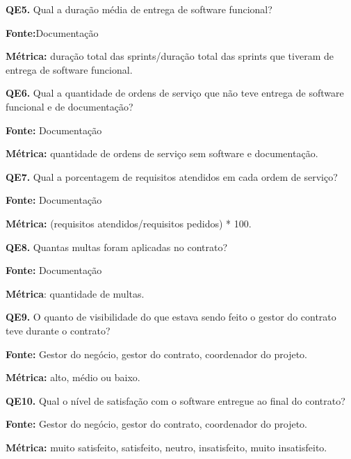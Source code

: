 \textbf{QE5.} Qual a duração média de entrega de software funcional?

\textbf{Fonte:}Documentação

\textbf{Métrica:} duração total das sprints/duração total das sprints que tiveram de entrega de software funcional.

 \vspace{\onelineskip} 

\textbf{QE6.} Qual a quantidade de ordens de serviço que não teve entrega de software funcional e de documentação?

\textbf{Fonte:} Documentação

\textbf{Métrica:} quantidade de ordens de serviço sem software e documentação.

 \vspace{\onelineskip} 
 
\textbf{QE7.} Qual a porcentagem de requisitos atendidos em cada ordem de serviço?

\textbf{Fonte:} Documentação

\textbf{Métrica:} (requisitos atendidos/requisitos pedidos) * 100.
 
 \vspace{\onelineskip} 

\textbf{QE8.} Quantas multas foram aplicadas no contrato?

\textbf{Fonte:} Documentação

\textbf{Métrica}: quantidade de multas.

 \vspace{\onelineskip}  

\textbf{QE9.} O quanto de visibilidade do que estava sendo feito o gestor do contrato teve durante o contrato?

\textbf{Fonte:} Gestor do negócio, gestor do contrato, coordenador do projeto.

\textbf{Métrica:} alto, médio ou baixo. 
 
 \vspace{\onelineskip} 

\textbf{QE10.} Qual o nível de satisfação com o software entregue ao final do contrato?

\textbf{Fonte:} Gestor do negócio, gestor do contrato, coordenador do projeto.

\textbf{Métrica:} muito satisfeito, satisfeito, neutro, insatisfeito, muito insatisfeito.
 
 \vspace{\onelineskip} 

